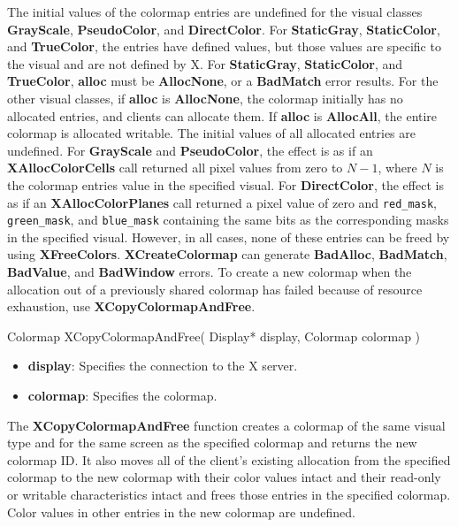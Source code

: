 \documentclass{report}
\begin{document}
\begin{itemize}
            \bigbreak \noindent
            The initial values of the colormap entries are undefined for the visual classes \textbf{GrayScale}, \textbf{PseudoColor}, and \textbf{DirectColor}. For \textbf{StaticGray}, \textbf{StaticColor}, and \textbf{TrueColor}, the entries have defined values, but those values are specific to the visual and are not defined by X. For \textbf{StaticGray}, \textbf{StaticColor}, and \textbf{TrueColor}, \textbf{alloc} must be \textbf{AllocNone}, or a \textbf{BadMatch} error results. For the other visual classes, if \textbf{alloc} is \textbf{AllocNone}, the colormap initially has no allocated entries, and clients can allocate them. 
            \bigbreak \noindent
            If \textbf{alloc} is \textbf{AllocAll}, the entire colormap is allocated writable. The initial values of all allocated entries are undefined. For \textbf{GrayScale} and \textbf{PseudoColor}, the effect is as if an \textbf{XAllocColorCells} call returned all pixel values from zero to $N - 1$, where $N$ is the colormap entries value in the specified visual. For \textbf{DirectColor}, the effect is as if an \textbf{XAllocColorPlanes} call returned a pixel value of zero and \texttt{red\_mask}, \texttt{green\_mask}, and \texttt{blue\_mask} containing the same bits as the corresponding masks in the specified visual. However, in all cases, none of these entries can be freed by using \textbf{XFreeColors}.
            \bigbreak \noindent
            \textbf{XCreateColormap} can generate \textbf{BadAlloc}, \textbf{BadMatch}, \textbf{BadValue}, and \textbf{BadWindow} errors.
            \bigbreak \noindent
            To create a new colormap when the allocation out of a previously shared colormap has failed because of resource exhaustion, use \textbf{XCopyColormapAndFree}.
            \bigbreak \noindent
            \begin{cppcode}
                Colormap XCopyColormapAndFree(
                    Display* display,
                    Colormap colormap
                )
            \end{cppcode}
            \begin{itemize}
                \item \textbf{display}: Specifies the connection to the X server.
                \item \textbf{colormap}: Specifies the colormap.
            \end{itemize}
            \bigbreak \noindent
            The \textbf{XCopyColormapAndFree} function creates a colormap of the same visual type and for the same screen as the specified colormap and returns the new colormap ID. It also moves all of the client's existing allocation from the specified colormap to the new colormap with their color values intact and their read-only or writable characteristics intact and frees those entries in the specified colormap. Color values in other entries in the new colormap are undefined.

\end{itemize}
\end{document}
